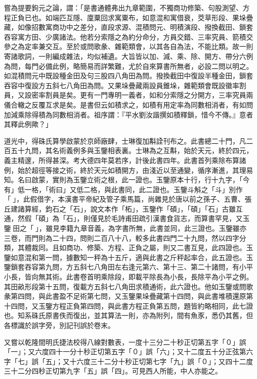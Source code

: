 \begin{pinyinscope}
嘗為提要鉤元之論，謂：「是書通體弗出九章範圍，不獨商功修築、句股測望、方程正負已也。如端匹互隱、廩粟回求寓粟布，如意混和寓借衰，茭草形段、果垛疊藏，如像招數寓商功中之差分，直段求源、混積問元、明積演段、撥換截田、鎖套吞容寓方田、少廣諸法。他若分索隱之為約分命分，方員交錯、三率究員、箭積交參之為定率兼交互。至於或問歌彖、雜範類會，以其各自為法，不能比類。故一則寄諸歌詞，一則編成雜法，均似補遺。大旨皆以加、減、乘、除、開方、帶分六例為問，每門必備此例，略簡易而詳繁難，尤於自來算書所無者，必設二問以明之。如混積問元中既設種金田及句三股四八角田為問。撥換截田中復設半種金田，鎖套吞容中復設方五斜七八角田為問。又果垛疊藏兩設員錐垛，雜範類會既設徽率割員，又設密率割員是矣。更有一門專明一義者，如和分索隱之分開方，三率究員兩儀合轍之反覆互求是矣。是書但云如積求之，如積有用定率為同數相消者，有如問加減乘除得積為同數相消者。祖序謂：『平水劉汝諧撰如積釋鎖，惜今不傳。』意者其釋此例歟？」

道光中，得硃氏算學啟蒙於京師廠肆，士琳復加斠詮刊布之。此書總二十門，凡二百五十九問，其名術義例多與玉鑒相表裏。士琳為之互斠，始於天元，終於四元，義主精邃，所得甚深。考大德四年莫若序，計後此書四年。此書首列乘除布算諸例，始於超徑等接之術，終於天元如積開方，由淺近以至通變，循序漸進，其理易知。名曰啟蒙，實則為玉鑒立術之根，此一證也。玉鑒原本十行，行十九字，「今有」低一格，「術曰」又低二格，與此書同，此二證也。玉鑒斗斛之「斗」別作「」，此假借字，本漢書平帝紀及管子乘馬篇，尚雜見於唐以前之孫子、五曹、張丘建諸算經，鈞石之「石」，說文本作「柘」，玉鑒作「碩」，「碩」「石」古雖互通，然假「碩」為「石」，則僅見於毛詩甫田疏引漢書食貨志，而算書罕見，又玉鑒田之「」，雖見李籍九章音義，為字書所無，此書並同，此三證也。玉鑒雖亦三卷，而門則為二十四，問則二百八十八，較多此書四門二十九問，然以四字分類，其體裁同。且如商功、修築、方程、正負之屬，則又二書互見，此四證也。玉鑒如意混和第一問，據數知一秤為十五斤，適與此書之斤秤起率合，此五證也。玉鑒鎖套吞容第九問，方五斜七八角田左右逢元第六、第十三、第二十諸問，有小平小長，皆向無其術。此書卷首明乘除段，即載平除長為小長，長除平為小平之例。其田畝形段第十五問，復載方五斜七八角田求積通術，此六證也。他如玉鑒或問歌彖第四問，與此書盈不足術第七問，又玉鑒果垛疊藏第十四問，與此書堆積還原第十四問，又玉鑒方程正負第四問，與此書方程正負第五問，題皆約略相同，此七證也。知系硃氏原書佚而復出，並其算法一則，亦為附列，間有魚豕，悉仍其舊，但各標識於誤字旁，別記刊誤於卷末。

又嘗以乾隆間明氏捷法校得八線對數表，一度十三分二十秒正切第五字「０」誤「一」；又六度四十一分十秒正切第五字「０」誤「六」；又十二度五十分正弦第六字「七」誤「五」；又十六度三十二分十秒正切第七字「九」誤「０」；又四十二度三十二分四秒正切第九字「五」誤「四」。可見西人所能，中人亦能之。


\end{pinyinscope}
